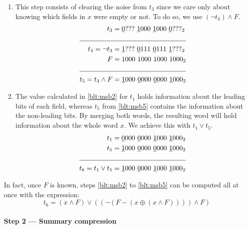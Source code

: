 \begin{enumerate}
    \item \label{blt:msb5}
    This step consists of clearing the noise from $t_3$ since we care only about knowing which fields in $x$ were empty or not. To do so, we use $(\neg t_3) \wedge F$.
    \begin{align*}
                       t_3 &= \underline{0}???\ \underline{1}000\ \underline{1}000\ \underline{0}???_2 \\ \cline{1-2} 
            t_4 = \neg t_3 &= \underline{1}???\ \underline{0}111\ \underline{0}111\ \underline{1}???_2 \\
                         F &= 1000\ 1000\ 1000\ 1000_2 \\ \cline{1-2} 
        t_5 = t_4 \wedge F &= \underline{1}000\ \underline{0}000\ \underline{0}000\ \underline{1}000_2
    \end{align*}
    
    \item \label{blt:msb6}
    The value calculated in \ref{blt:msb2} for $t_1$ holds information about the leading bits of each field, whereas $t_5$ from \ref{blt:msb5} contains the information about the non-leading bits. By merging both words, the resulting word will hold information about the whole word $x$. We achieve this with $t_1 \vee t_5$.
    \begin{align*}
                       t_1 &= \underline{0}000\ \underline{0}000\ \underline{1}000\ \underline{1}000_2 \\
                       t_5 &= \underline{1}000\ \underline{0}000\ \underline{0}000\ \underline{1}000_2 \\ \cline{1-2} 
        t_6 = t_1 \vee t_5 &= \underline{1}000\ \underline{0}000\ \underline{1}000\ \underline{1}000_2
    \end{align*}
\end{enumerate}

In fact, once $F$ is known, steps \ref{blt:msb2} to \ref{blt:msb5} can be computed all at once with the expression:
\begin{equation}
    t_6 = (x \wedge F) \vee ((\neg(F - (x \oplus(x \wedge F)))) \wedge F)
\end{equation}

\paragraph{Step 2 --- Summary compression} \label{sec:summaryCompression}

